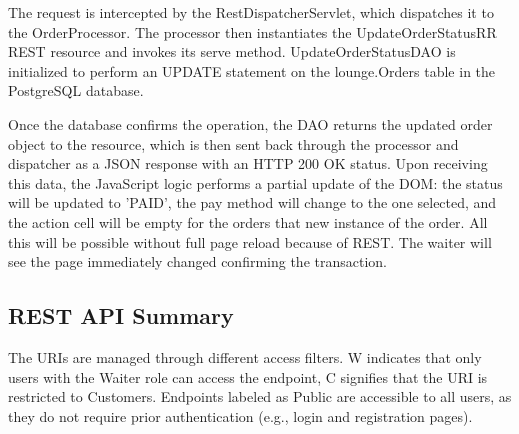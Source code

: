 \documentclass[a4paper]{article}
\begin{document}
The request is intercepted by the RestDispatcherServlet, which dispatches it to the OrderProcessor. The processor then instantiates the UpdateOrderStatusRR REST resource and invokes its serve method. UpdateOrderStatusDAO is initialized to perform an UPDATE statement on the lounge.Orders table in the PostgreSQL database. 

Once the database confirms the operation, the DAO returns the updated order object to the resource, which is then sent back through the processor and dispatcher as a JSON response with an HTTP 200 OK status. Upon receiving this data, the JavaScript logic performs a partial update of the DOM: the status will be updated to 'PAID', the pay method will change to the one selected, and the action cell will be empty for the orders that new instance of the order. All this will be possible without full page reload because of REST. The waiter will see the page immediately changed confirming the transaction.

\subsection{REST API Summary}
The URIs are managed through different access filters. W indicates that only users with the Waiter role can access the endpoint, C signifies that the URI is restricted to Customers. Endpoints labeled as Public are accessible to all users, as they do not require prior authentication (e.g., login and registration pages).
\end{document}
